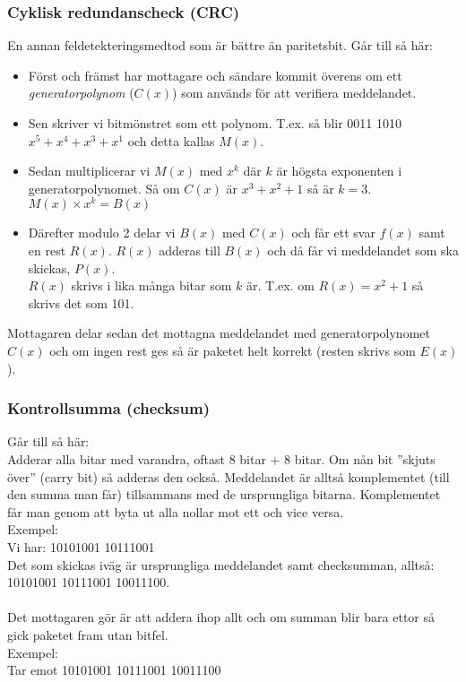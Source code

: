 \documentclass[11pt]{article}
\begin{document}
\subsubsection*{Cyklisk redundanscheck (CRC)}
En annan feldetekteringsmedtod som är bättre än paritetsbit. Går till så här: 
\begin{itemize}
\item{Först och främst har mottagare och sändare kommit överens om ett \emph{generatorpolynom} ($C(x)$) som används för att verifiera meddelandet. }
\item{Sen skriver vi bitmönstret som ett polynom. T.ex. så blir 0011 1010 $x^5 + x^4 + x^3 + x^1$ och detta kallas $M(x)$.}
\item{Sedan multiplicerar vi $M(x)$ med $x^k$ där $k$ är högsta exponenten i generatorpolynomet. Så om $C(x)$ är $x^3+x^2+1$ så är $k=3$. $M(x) \times x^k = B(x)$}
\item{Därefter modulo 2 delar vi $B(x)$ med $C(x)$ och får ett svar $f(x)$ samt en rest $R(x)$. $R(x)$ adderas till $B(x)$ och då får vi meddelandet som ska skickas, $P(x)$. \\
$R(x)$ skrivs i lika många bitar som $k$ är. T.ex. om $R(x) = x^2 + 1$ så skrivs det som 101.}
\end{itemize} 
Mottagaren delar sedan det mottagna meddelandet med generatorpolynomet $C(x)$ och om ingen rest ges så är paketet helt korrekt (resten skrivs som $E(x)$).
\subsubsection*{Kontrollsumma (checksum)}
Går till så här: \\
Adderar alla bitar med varandra, oftast 8 bitar + 8 bitar. Om nån bit ''skjuts över'' (carry bit) så adderas den också. Meddelandet är alltså komplementet (till den summa man får) tillsammans med de ursprungliga bitarna. Komplementet får man genom att byta ut alla nollar mot ett och vice versa. \\
Exempel: \\
Vi har: 10101001 10111001\\
Det som skickas iväg är ursprungliga meddelandet samt checksumman, alltså: 10101001 10111001 10011100. \\ \\
Det mottagaren gör är att addera ihop allt och om summan blir bara ettor så gick paketet fram utan bitfel. \\ 
Exempel: \\
Tar emot 10101001 10111001 10011100 \\
\end{document}
